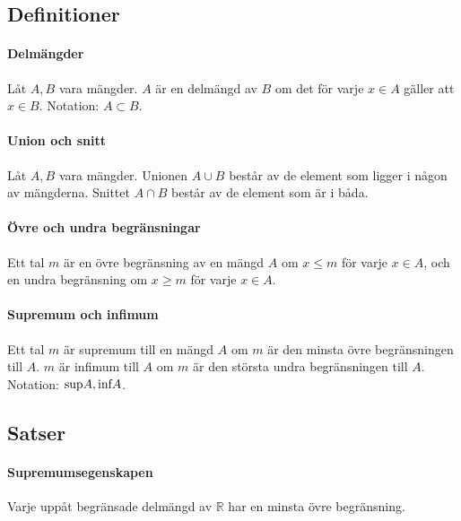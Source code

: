 \subsection{Definitioner}

\paragraph{Delmängder}

Låt $A, B$ vara mängder. $A$ är en delmängd av $B$ om det för varje $x \in A$ gäller att $x \in B$. Notation: $A \subset B$.

\paragraph{Union och snitt}

Låt $A, B$ vara mängder. Unionen $A \cup B$ består av de element som ligger i någon av mängderna. Snittet $A \cap B$ består av de element som är i båda.

\paragraph{Övre och undra begränsningar}

Ett tal $m$ är en övre begränsning av en mängd $A$ om $x \leq m$ för varje $x \in A$, och en undra begränsning om $x \geq m$ för varje $x \in A$.

\paragraph{Supremum och infimum}

Ett tal $m$ är supremum till en mängd $A$ om $m$ är den minsta övre begränsningen till $A$. $m$ är infimum till $A$ om $m$ är den största undra begränsningen till $A$. Notation: $\textnormal{sup}A, \textnormal{inf}A$.

\subsection{Satser}

\paragraph{Supremumsegenskapen}

Varje uppåt begränsade delmängd av $\mathbb{R}$ har en minsta övre begränsning.